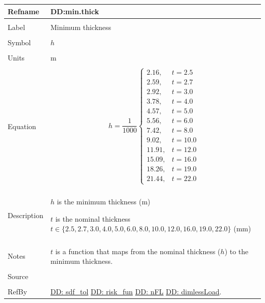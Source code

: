 \documentclass[12pt]{article}
\begin{document}
\noindent \begin{minipage}{\textwidth}
\begin{tabular}{p{} p{}}
\toprule \textbf{Refname} & \textbf{DD:min.thick}
\label{DD:min.thick}
\\ \midrule \\
Label & Minimum thickness
\\ \midrule \\
Symbol & $h$
\\ \midrule \\
Units & m
\\ \midrule \\
Equation & \begin{dmath}
           h=\frac{1}{1000} \begin{cases}
2.16, & t=2.5\\
2.59, & t=2.7\\
2.92, & t=3.0\\
3.78, & t=4.0\\
4.57, & t=5.0\\
5.56, & t=6.0\\
7.42, & t=8.0\\
9.02, & t=10.0\\
11.91, & t=12.0\\
15.09, & t=16.0\\
18.26, & t=19.0\\
21.44, & t=22.0
\end{cases}
           \end{dmath}
\\ \midrule \\
Description & \begin{symbDescription}
              \item{$h$ is the minimum thickness (m)}
              \item{$t$ is the nominal thickness $t\in{}\{2.5,2.7,3.0,4.0,5.0,6.0,8.0,10.0,12.0,16.0,19.0,22.0\}$ (mm)}
              \end{symbDescription}
\\ \midrule \\
Notes & $t$ is a function that maps from the nominal thickness ($h$) to the minimum thickness.
\\ \midrule \\
Source & \cite{astm2009}
\\ \midrule \\
RefBy & \hyperref[DD:sdf.tol]{DD: sdf\_tol} \hyperref[DD:risk.fun]{DD: risk\_fun} \hyperref[DD:nFL]{DD: nFL} \hyperref[DD:dimlessLoad]{DD: dimlessLoad}.
\\ \bottomrule \end{tabular}
\end{minipage}\\
\end{document}
